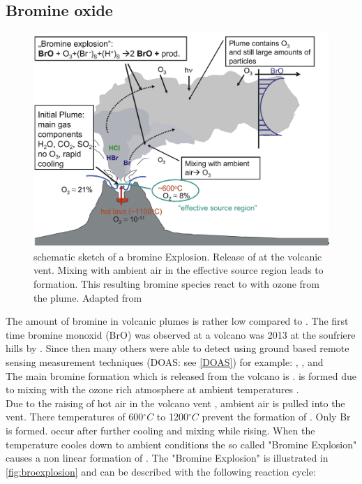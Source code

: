 \documentclass  [
  paper    = a4,
  BCOR     = 10mm,
  twoside,
  fontsize = 12pt,
  fleqn,
  toc      = bibnumbered,
  toc      = listofnumbered,
  numbers  = noendperiod,
  headings = normal,
  listof   = leveldown,
  version  = 3.03
]                                       {scrreprt}
\begin{document}
\subsection{Bromine oxide}
\begin{figure}
	\centering
	\includegraphics[width=0.8\linewidth]{Bilder/Simon/Bilder_Tung/BrO_Plume}
	\caption{schematic sketch of a bromine Explosion.
		Release of  at the volcanic vent. Mixing with ambient air in the effective source region leads to  formation. This resulting bromine species react to  with ozone from the plume. Adapted from \citet{bobrowski2007reactive}}
	\label{fig:broplume}
\end{figure}
The amount of bromine in volcanic plumes is rather low compared to . The first time bromine monoxid (BrO) was observed at a volcano was 2013 at the soufriere hills by \citet{bobrowski2003detection}. Since then many others were able to detect   using ground based remote sensing measurement techniques (DOAS: see \cref{DOAS}) for example:
\citet{bobrowski2007so2}, \citet{bobrowski2007reactive},\citet{vogel2011volcanic} and \citet{lubcke2014bro}
\\
The main bromine formation which is released from the volcano is  .   is formed due to mixing with the ozone rich atmosphere at ambient temperatures \citep{bobrowski2007reactive}.\\
Due to the raising of hot air in the volcano vent , ambient air is pulled into the vent. There temperatures of  600$^{\circ}C$ to 1200$^{\circ}C$    prevent the formation of . Only Br is formed.   occur after further cooling and mixing while rising. When the temperature cooles down to ambient conditions the so called "Bromine Explosion" causes a non linear formation of .
The "Bromine Explosion" is illustrated in \cref{fig:broexplosion} and can be described with the following reaction cycle:
\end{document}
